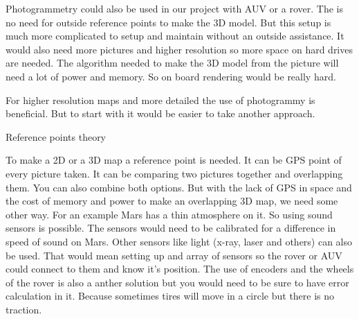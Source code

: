 Photogrammetry could also be used in our project with AUV or a rover. The is no need for outside reference points to make the 3D model. But this setup is much more complicated to setup and maintain without an outside assistance. It would also need more pictures and higher resolution so more space on hard drives are needed. The algorithm needed to make the 3D model from the picture will need a lot of power and memory. So on board rendering would be really hard.

For higher resolution maps and more detailed the use of photogrammy is beneficial. But to start with it would be easier to take another approach.

Reference points theory

To make a 2D or a 3D map a reference point is needed. It can be GPS point of every picture taken. It can be comparing two pictures together and overlapping them. You can also combine both options. But with the lack of GPS in space and the cost of memory and power to make an overlapping 3D map, we need some other way. For an example Mars has a thin atmosphere on it. So using sound sensors is possible. The sensors would need to be calibrated for a difference in speed of sound on Mars. Other sensors like light (x-ray, laser and others) can also be used. That would mean setting up and array of sensors so the rover or AUV could connect to them and know it's position. The use of encoders and the wheels of the rover is also a anther solution but you would need to be sure to have error calculation in it. Because sometimes tires will move in a circle but there is no traction.  %





















